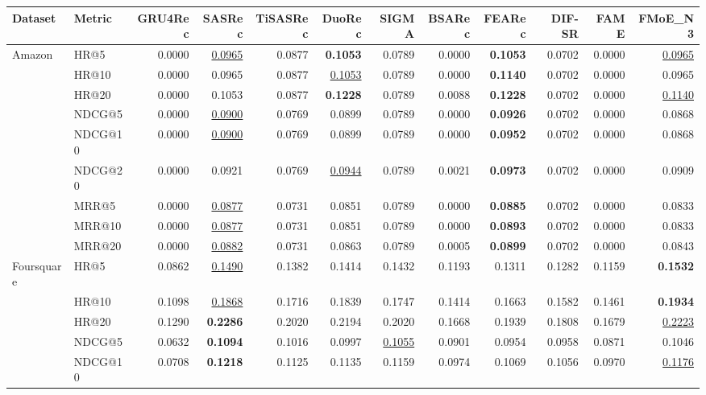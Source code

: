 \begin{tabular}{llrrrrrrrrrr}
\hline
Dataset & Metric & GRU4Rec & SASRec & TiSASRec & DuoRec & SIGMA & BSARec & FEARec & DIF-SR & FAME & FMoE\_N3 \\
\hline
Amazon & HR@5 & 0.0000 & \underline{0.0965} & 0.0877 & \textbf{0.1053} & 0.0789 & 0.0000 & \textbf{0.1053} & 0.0702 & 0.0000 & \underline{0.0965} \\
 & HR@10 & 0.0000 & 0.0965 & 0.0877 & \underline{0.1053} & 0.0789 & 0.0000 & \textbf{0.1140} & 0.0702 & 0.0000 & 0.0965 \\
 & HR@20 & 0.0000 & 0.1053 & 0.0877 & \textbf{0.1228} & 0.0789 & 0.0088 & \textbf{0.1228} & 0.0702 & 0.0000 & \underline{0.1140} \\
 & NDCG@5 & 0.0000 & \underline{0.0900} & 0.0769 & 0.0899 & 0.0789 & 0.0000 & \textbf{0.0926} & 0.0702 & 0.0000 & 0.0868 \\
 & NDCG@10 & 0.0000 & \underline{0.0900} & 0.0769 & 0.0899 & 0.0789 & 0.0000 & \textbf{0.0952} & 0.0702 & 0.0000 & 0.0868 \\
 & NDCG@20 & 0.0000 & 0.0921 & 0.0769 & \underline{0.0944} & 0.0789 & 0.0021 & \textbf{0.0973} & 0.0702 & 0.0000 & 0.0909 \\
 & MRR@5 & 0.0000 & \underline{0.0877} & 0.0731 & 0.0851 & 0.0789 & 0.0000 & \textbf{0.0885} & 0.0702 & 0.0000 & 0.0833 \\
 & MRR@10 & 0.0000 & \underline{0.0877} & 0.0731 & 0.0851 & 0.0789 & 0.0000 & \textbf{0.0893} & 0.0702 & 0.0000 & 0.0833 \\
 & MRR@20 & 0.0000 & \underline{0.0882} & 0.0731 & 0.0863 & 0.0789 & 0.0005 & \textbf{0.0899} & 0.0702 & 0.0000 & 0.0843 \\
\hline
Foursquare & HR@5 & 0.0862 & \underline{0.1490} & 0.1382 & 0.1414 & 0.1432 & 0.1193 & 0.1311 & 0.1282 & 0.1159 & \textbf{0.1532} \\
 & HR@10 & 0.1098 & \underline{0.1868} & 0.1716 & 0.1839 & 0.1747 & 0.1414 & 0.1663 & 0.1582 & 0.1461 & \textbf{0.1934} \\
 & HR@20 & 0.1290 & \textbf{0.2286} & 0.2020 & 0.2194 & 0.2020 & 0.1668 & 0.1939 & 0.1808 & 0.1679 & \underline{0.2223} \\
 & NDCG@5 & 0.0632 & \textbf{0.1094} & 0.1016 & 0.0997 & \underline{0.1055} & 0.0901 & 0.0954 & 0.0958 & 0.0871 & 0.1046 \\
 & NDCG@10 & 0.0708 & \textbf{0.1218} & 0.1125 & 0.1135 & 0.1159 & 0.0974 & 0.1069 & 0.1056 & 0.0970 & \underline{0.1176} \\

\end{tabular}
